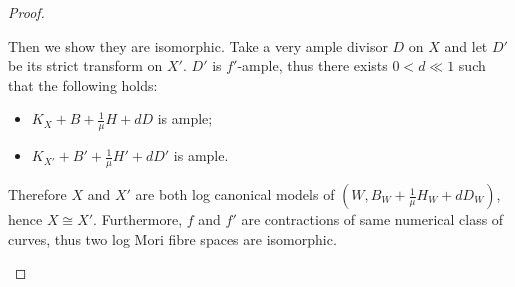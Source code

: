 \documentclass[11pt]{amsart}
\begin{document}
\begin{proof}
\begin{enumerate}
Then we show they are isomorphic. Take a very ample divisor $ D $ on $ X $ and let $ D'  $ be its strict transform on $ X' $. $ D' $ is $ f' $-ample, thus there exists $ 0<d\ll1 $ such that the following holds:
      \begin{itemize}
        \item $ K_X+B+\frac{1}{\mu }H+dD $ is ample;
        \item $ K_{X'}+B'+\frac{1}{\mu }H'+dD' $ is ample.
      \end{itemize}
  Therefore $X$ and $X'$ are both log canonical models of $(W,B_{W}+\frac{1}{\mu}H_{W}+dD_{W})$, hence $X\cong X'$. Furthermore, $f$ and  $f'$ are contractions of same numerical class of curves, thus two log Mori fibre spaces are isomorphic.
\end{enumerate}
\end{proof}
\end{document}

